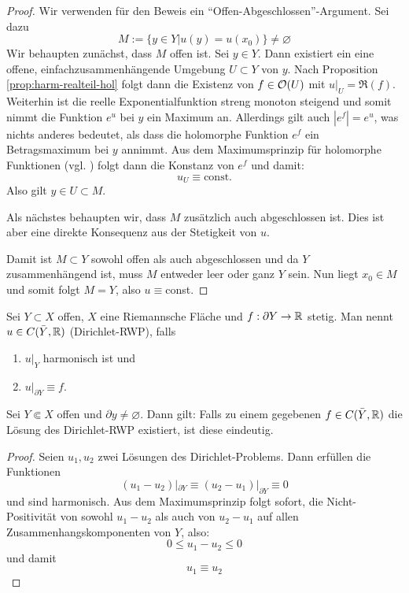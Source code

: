 \begin{proof}
  Wir verwenden für den Beweis ein
  "`Offen-Abgeschlossen"'-Argument. Sei dazu
  \[
  M:= \{ y \in Y| u(y) = u(x_0)\} \neq \varnothing
  \]
  Wir behaupten zunächst, dass $M$ offen ist.
  Sei $y \in Y$. Dann existiert ein eine offene,
  einfachzusammenhängende Umgebung $U \subset Y$ von $y$. 
  Nach Proposition \ref{prop:harm-realteil-hol} folgt dann die
  Existenz von $f \in \mathcal{O}(U)$ mit $u|_U = \Re(f)$.
  Weiterhin ist die reelle Exponentialfunktion streng monoton
  steigend und somit nimmt die Funktion $e^u$ bei $y$ ein Maximum
  an. Allerdings gilt auch $|e^f| = e^u$, was nichts anderes
  bedeutet, als dass die holomorphe Funktion $e^f$ ein
  Betragsmaximum bei $y$ annimmt. 
  Aus dem Maximumsprinzip für holomorphe Funktionen (vgl. \cite[Kor. 2.6]{For}) folgt dann die
  Konstanz von $e^f$ und damit:
  \[
  u_U \equiv \text{const.}
  \]
  Also gilt $y \in U \subset M$.
  
  Als nächstes behaupten wir, dass $M$ zusätzlich auch abgeschlossen
  ist. Dies ist aber eine direkte Konsequenz aus der Stetigkeit von $u$.

  Damit ist $M \subset Y$ sowohl offen als auch abgeschlossen und da
  $Y$ zusammenhängend ist, muss $M$ entweder leer oder ganz $Y$
  sein. Nun liegt $x_0 \in M$ und somit folgt $M = Y$, also $u \equiv$const.
\end{proof}

\begin{defin}
  \label{defin:rwp}
  Sei $Y\subset X$ offen, $X$ eine Riemannsche Fläche und $f: \partial
  Y \rightarrow \mathbb{R}$ stetig. Man nennt $u \in C(\bar Y, \mathbb{R})$  (Dirichlet-RWP), falls
  \begin{enumerate}
  \item $u|_Y$ harmonisch ist und
  \item $u|_{\partial Y} \equiv f$.
  \end{enumerate}
\end{defin}

\begin{prop}
  \label{prop:dirichlet-eindeutig}
  Sei $Y \Subset X$ offen und $\partial y \neq \varnothing$. Dann
  gilt: Falls zu einem gegebenen $f \in C(\bar Y, \mathbb{R})$ die Lösung des
  Dirichlet-RWP existiert, ist diese eindeutig.
\end{prop}

\begin{proof}
  Seien $u_1, u_2$ zwei Lösungen des Dirichlet-Problems. Dann erfüllen
  die Funktionen
  \[
  (u_1 - u_2)|_{\partial Y} \equiv (u_2 - u_1)|_{\partial Y} \equiv 0
  \]
  und sind harmonisch. Aus dem Maximumsprinzip folgt sofort, die
  Nicht-Positivität von sowohl $u_1 - u_2$ als auch von $u_2 - u_1$
  auf allen Zusammenhangskomponenten von $Y$, also:
  \[
  0 \leq u_1 - u_2 \leq 0
  \]
  und damit
  \[
  u_1 \equiv u_2
  \]
\end{proof}

